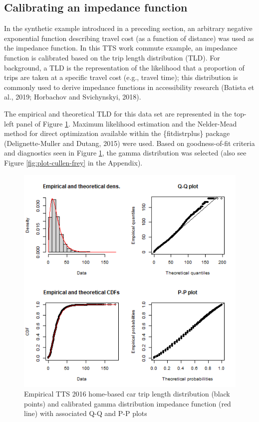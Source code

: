 \documentclass[]{elsarticle} %
\begin{document}
\hypertarget{calibrating-an-impedance-function}{%
\subsection{Calibrating an impedance
function}\label{calibrating-an-impedance-function}}

In the synthetic example introduced in a preceding section, an arbitrary
negative exponential function describing travel cost (as a function of
distance) was used as the impedance function. In this TTS work commute
example, an impedance function is calibrated based on the trip length
distribution (TLD). For background, a TLD is the representation of the
likelihood that a proportion of trips are taken at a specific travel
cost (e.g., travel time); this distribution is commonly used to derive
impedance functions in accessibility research (Batista et al., 2019;
Horbachov and Svichynskyi, 2018).

The empirical and theoretical TLD for this data set are represented in
the top-left panel of Figure \ref{fig:TLD-Gamma-plot}. Maximum
likelihood estimation and the Nelder-Mead method for direct optimization
available within the \{fitdistrplus\} package (Delignette-Muller and
Dutang, 2015) were used. Based on goodness-of-fit criteria and
diagnostics seen in Figure \ref{fig:TLD-Gamma-plot}, the gamma
distribution was selected (also see Figure \ref{fig:plot-cullen-frey} in
the Appendix).

\begin{figure}

{\centering \includegraphics[width=1\linewidth]{images/impedance_function} 

}

\caption{\label{fig:TLD-Gamma-plot}Empirical TTS 2016 home-based car trip length distribution (black points) and calibrated gamma distribution impedance function (red line) with associated Q-Q and P-P plots}\label{fig:TLD-Gamma-plot}
\end{figure}
\end{document}

